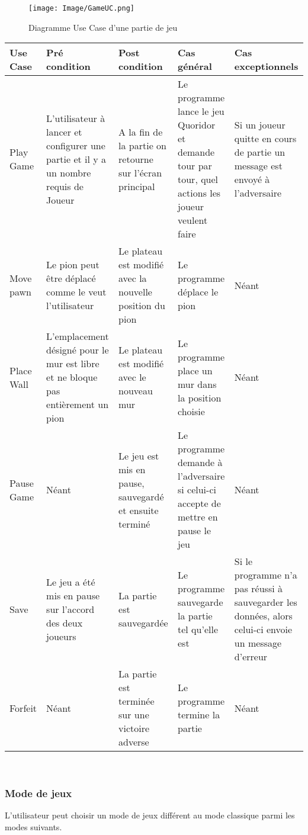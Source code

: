 \documentclass[french, utf8]{article}
\begin{document}
\begin{figure}[ht]
     \centering
    \texttt{[image: Image/GameUC.png]}
\caption{Diagramme Use Case d'une partie de jeu}
\end{figure}
\begin{center}
\begin{tabular}{|m{3cm}|m{3cm}|m{3cm}|m{3cm}|m{3cm}|}
\hline  Use Case & Pré condition      &  Post condition  & Cas général & Cas exceptionnels\\
\hline Play Game& L'utilisateur à lancer et configurer une partie et il y a un nombre requis de Joueur & A la fin de la partie on retourne sur l'écran principal & Le programme lance le jeu Quoridor et demande tour par tour, quel actions les joueur veulent faire & Si un joueur quitte en cours de partie un message est envoyé à l'adversaire  \\
\hline Move pawn  & Le pion peut être déplacé comme le veut l'utilisateur & Le plateau est modifié avec la nouvelle position du pion & Le programme déplace le pion & Néant \\
\hline Place Wall  & L'emplacement désigné pour le mur est libre et ne bloque pas entièrement un pion & Le plateau est modifié avec le nouveau mur & Le programme place un mur dans la position choisie & Néant \\
\hline Pause Game  & Néant & Le jeu est mis en pause, sauvegardé et ensuite terminé & Le programme demande à l'adversaire si celui-ci accepte de mettre en pause le jeu & Néant \\
\hline Save  & Le jeu a été mis en pause sur l'accord des deux joueurs & La partie est sauvegardée & Le programme sauvegarde la partie tel qu'elle est & Si le programme n'a pas réussi à sauvegarder les données, alors celui-ci envoie un message d'erreur \\
\hline Forfeit  & Néant & La partie est terminée sur une victoire adverse & Le programme termine la partie & Néant \\
\hline
\end{tabular}\\
\end{center}

\subsubsection{Mode de jeux}
L'utilisateur peut choisir un mode de jeux différent au mode classique parmi les modes suivants.
\end{document}
